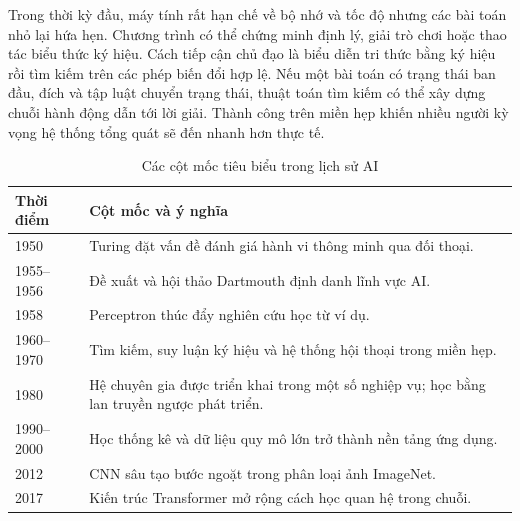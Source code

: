 \documentclass[12pt,a4paper]{report}
\begin{document}
Trong thời kỳ đầu, máy tính rất hạn chế về bộ nhớ và tốc độ nhưng các bài toán nhỏ lại hứa hẹn. Chương trình có thể chứng minh định lý, giải trò chơi hoặc thao tác biểu thức ký hiệu. Cách tiếp cận chủ đạo là biểu diễn tri thức bằng ký hiệu rồi tìm kiếm trên các phép biến đổi hợp lệ. Nếu một bài toán có trạng thái ban đầu, đích và tập luật chuyển trạng thái, thuật toán tìm kiếm có thể xây dựng chuỗi hành động dẫn tới lời giải. Thành công trên miền hẹp khiến nhiều người kỳ vọng hệ thống tổng quát sẽ đến nhanh hơn thực tế.

\begin{table}[htbp]\centering\caption{Các cột mốc tiêu biểu trong lịch sử AI}\label{tab:history-timeline}
\begin{tabularx}{\textwidth}{p{1.7cm}X}
\toprule\textbf{Thời điểm} & \textbf{Cột mốc và ý nghĩa}\\\midrule
1950 & Turing đặt vấn đề đánh giá hành vi thông minh qua đối thoại.\\
1955--1956 & Đề xuất và hội thảo Dartmouth định danh lĩnh vực AI.\\
1958 & Perceptron thúc đẩy nghiên cứu học từ ví dụ.\\
1960--1970 & Tìm kiếm, suy luận ký hiệu và hệ thống hội thoại trong miền hẹp.\\
1980 & Hệ chuyên gia được triển khai trong một số nghiệp vụ; học bằng lan truyền ngược phát triển.\\
1990--2000 & Học thống kê và dữ liệu quy mô lớn trở thành nền tảng ứng dụng.\\
2012 & CNN sâu tạo bước ngoặt trong phân loại ảnh ImageNet.\\
2017 & Kiến trúc Transformer mở rộng cách học quan hệ trong chuỗi.\\
\bottomrule\end{tabularx}\end{table}
\end{document}
